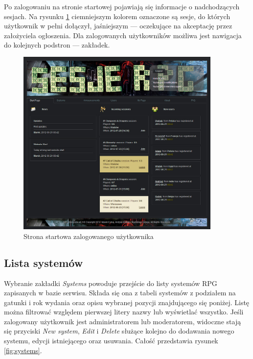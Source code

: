 Po zalogowaniu na stronie startowej pojawiają się informacje o nadchodzących sesjach. Na rysunku \ref{fig:start_page_joined} ciemniejszym kolorem oznaczone są sesje, do których użytkownik w pełni dołączył, jaśniejszym --- oczekujące na akceptację przez założyciela ogłoszenia. Dla zalogowanych użytkowników możliwa jest nawigacja do kolejnych podstron --- zakładek.
\begin{figure}[htb]	
\centering
\includegraphics[width=0.9\textwidth]{./img/interfejsy/start_page_joined}
\caption{Strona startowa zalogowanego użytkownika}
\label{fig:start_page_joined}
\end{figure}

\subsection{Lista systemów}
\label{sec:systems}
Wybranie zakładki \emph{Systems} powoduje przejście do listy systemów RPG zapisanych w bazie serwisu. Składa się ona z tabeli systemów z podziałem na gatunki i rok wydania oraz opisu wybranej pozycji znajdującego się poniżej. Listę można filtrować względem pierwszej litery nazwy lub wyświetlać wszystko. Jeśli zalogowany użytkownik jest administratorem lub moderatorem, widoczne stają się przyciski \emph{New system}, \emph{Edit} i \emph{Delete} służące kolejno do dodawania nowego systemu, edycji istniejącego oraz usuwania. Całość przedstawia rysunek \ref{fig:systems}.

